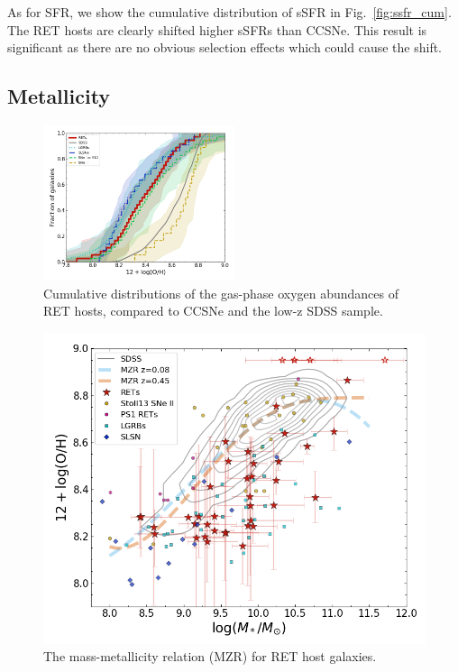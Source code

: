 \documentclass[fleqn,usenatbib,]{mnras}
\begin{document}
As for SFR, we show the cumulative distribution of sSFR in Fig.~\ref{fig:ssfr_cum}. The RET hosts are clearly shifted higher sSFRs than CCSNe. This result is significant as there are no obvious selection effects which could cause the shift.

\subsection{Metallicity \label{subsec:res_metallicity}}
\begin{figure}
\includegraphics[width=0.5\textwidth]{figs/RET_OH_cum.png}
\caption{Cumulative distributions of the gas-phase oxygen abundances of RET hosts, compared to CCSNe and the low-z SDSS sample.
\label{fig:oh_cum}}
\end{figure}

\begin{figure}
\includegraphics[width=\textwidth]{figs/RET_MZR.png}
\caption{The mass-metallicity relation (MZR) for RET host galaxies.
\label{fig:mzr}}
\end{figure}
\end{document}
